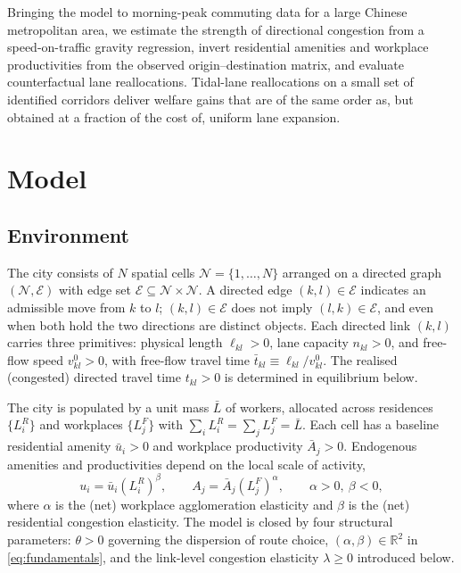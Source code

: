\documentclass[12pt]{article}
\newcommand{\N}{\mathcal N}
\newcommand{\E}{\mathcal E}
\newcommand{\Lbar}{\bar L}
\newcommand{\ubar}{\bar u}
\newcommand{\Abar}{\bar A}
\newcommand{\tbar}{\bar t}
\newcommand{\tkl}{t_{kl}}
\begin{document}
Bringing the model to morning-peak commuting data for a large Chinese
metropolitan area, we estimate the strength of directional congestion
from a speed-on-traffic gravity regression, invert residential
amenities and workplace productivities from the observed
origin--destination matrix, and evaluate counterfactual lane
reallocations.  Tidal-lane reallocations on a small set of identified
corridors deliver welfare gains that are of the same order as, but
obtained at a fraction of the cost of, uniform lane expansion.

\section{Model}\label{sec:model}

\subsection{Environment}\label{ssec:env}

The city consists of $N$ spatial cells $\N=\{1,\dots,N\}$ arranged on
a directed graph $(\N,\E)$ with edge set
$\E\subseteq\N\times\N$.  A directed edge $(k,l)\in\E$ indicates an
admissible move from $k$ to $l$; $(k,l)\in\E$ does not imply
$(l,k)\in\E$, and even when both hold the two directions are distinct
objects.  Each directed link $(k,l)$ carries three primitives:
physical length $\ell_{kl}>0$, lane capacity $n_{kl}>0$, and free-flow
speed $v^{0}_{kl}>0$, with free-flow travel time
$\tbar_{kl}\equiv\ell_{kl}/v^{0}_{kl}$.  The realised (congested)
directed travel time $\tkl>0$ is determined in equilibrium below.

The city is populated by a unit mass $\Lbar$ of workers, allocated
across residences $\{L_i^R\}$ and workplaces $\{L_j^F\}$ with
$\sum_iL_i^R=\sum_jL_j^F=\Lbar$.  Each cell has a baseline residential
amenity $\ubar_i>0$ and workplace productivity $\Abar_j>0$.  Endogenous
amenities and productivities depend on the local scale of activity,
\begin{equation}
  u_i=\ubar_i(L_i^R)^{\beta},\qquad
  A_j=\Abar_j(L_j^F)^{\alpha},\qquad
  \alpha>0,\ \beta<0,
  \label{eq:fundamentals}
\end{equation}
where $\alpha$ is the (net) workplace agglomeration elasticity and
$\beta$ is the (net) residential congestion elasticity.  The model is
closed by four structural parameters: $\theta>0$ governing the
dispersion of route choice, $(\alpha,\beta)\in\mathbb R^2$ in
\eqref{eq:fundamentals}, and the link-level congestion elasticity
$\lambda\ge 0$ introduced below.
\end{document}
